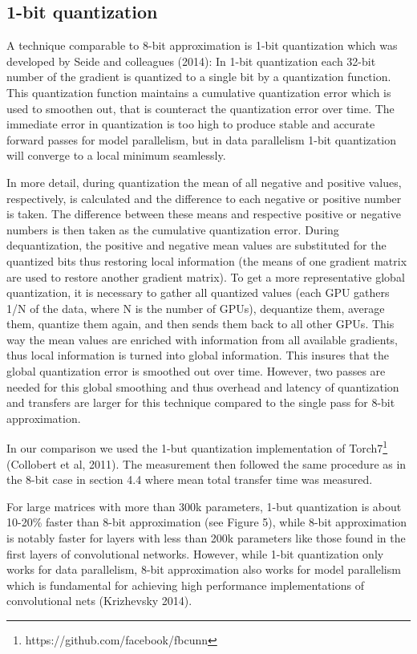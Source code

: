 \documentclass{article} %
\begin{document}
\subsection{1-bit quantization}
A technique comparable to 8-bit approximation is 1-bit quantization which was developed by Seide and colleagues (2014): In 1-bit quantization each 32-bit number of the gradient is quantized to a single bit by a quantization function. This quantization function maintains a cumulative quantization error which is used to smoothen out, that is counteract the quantization error over time. The immediate error in quantization is too high to produce stable and accurate forward passes for model parallelism, but in data parallelism 1-bit quantization will converge to a local minimum seamlessly. 

In more detail, during quantization the mean of all negative and positive values, respectively, is calculated and the difference to each negative or positive number is taken. The difference between these means and respective positive or negative numbers is then taken as the cumulative quantization error. During dequantization, the positive and negative mean values are substituted for the quantized bits thus restoring local information (the means of one gradient matrix are used to restore another gradient matrix). To get a more representative global quantization, it is necessary to gather all quantized values (each GPU gathers 1/N of the data, where N is the number of GPUs), dequantize them, average them, quantize them again, and then sends them back to all other GPUs. This way the mean values are enriched with information from all available gradients, thus local information is turned into global information. This insures that the global quantization error is smoothed out over time. However, two passes are needed for this global smoothing and thus overhead and latency of quantization and transfers are larger for this technique compared to the single pass for 8-bit approximation.

In our comparison we used the 1-but quantization implementation of Torch7\footnote{https://github.com/facebook/fbcunn} (Collobert et al, 2011). The measurement then followed the same procedure as in the 8-bit case in section 4.4 where mean total transfer time was measured.

For large matrices with more than 300k parameters, 1-but quantization is about 10-20\% faster than 8-bit approximation (see Figure 5), while 8-bit approximation is notably faster for layers with less than 200k parameters like those found in the first layers of convolutional networks. However, while 1-bit quantization only works for data parallelism, 8-bit approximation also works for model parallelism which is fundamental for achieving high performance implementations of convolutional nets (Krizhevsky 2014). 
\end{document}
